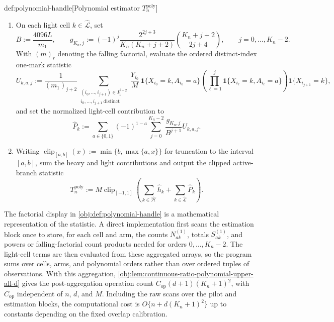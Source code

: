 \documentclass[11pt]{article}
\begin{document}
\begin{algorithmv}{def:polynomial-handle}[Polynomial estimator \(T_n^{\mathrm{poly}}\)]
\begin{enumerate}
\item On each light cell \(k\in\widehat{\mathcal L}\), set
\[
B:=\frac{4096L}{m_1},
\qquad
g_{K_n,j}:=
(-1)^j\frac{2^{2j+3}}{K_n(K_n+j+2)}{K_n+j+2\choose 2j+4},
\qquad
j=0,\ldots,K_n-2.
\]
With \((m)_r\) denoting the falling factorial, evaluate the ordered distinct-index one-mark statistic
\[
U_{k,a,j}
:=
\frac{1}{(m_1)_{j+2}}
\sum_{\substack{(i_0,\ldots,i_{j+1})\in I_1^{j+2}\\
i_0,\ldots,i_{j+1}\ \mathrm{distinct}}}
\frac{Y_{i_0}}{M}\,
\mathbf 1\{X_{i_0}=k,A_{i_0}=a\}
\left(\prod_{\ell=1}^{j}\mathbf 1\{X_{i_\ell}=k,A_{i_\ell}=a\}\right)
\mathbf 1\{X_{i_{j+1}}=k\},
\]
and set the normalized light-cell contribution to
\[
\widehat P_k
:=
\sum_{a\in\{0,1\}}(-1)^{1-a}
\sum_{j=0}^{K_n-2}\frac{g_{K_n,j}}{B^{j+1}}U_{k,a,j}.
\]

\item Writing \(\operatorname{clip}_{[a,b]}(x):=\min\{b,\max\{a,x\}\}\) for truncation to the interval \([a,b]\), sum the heavy and light contributions and output the clipped active-branch statistic
\[
T_n^{\mathrm{poly}}
:=
M\operatorname{clip}_{[-1,1]}
\left(
\sum_{k\in\widehat{\mathcal H}}\widehat h_k
+
\sum_{k\in\widehat{\mathcal L}}\widehat P_k
\right).
\]
\end{enumerate}
\end{algorithmv}

The factorial display in \cref{obj:def:polynomial-handle} is a mathematical representation of the statistic. A direct implementation first scans the estimation block once to store, for each cell and arm, the counts \(N_{ak}^{(1)}\), totals \(S_{ak}^{(1)}\), and powers or falling-factorial count products needed for orders \(0,\ldots,K_n-2\). The light-cell terms are then evaluated from these aggregated arrays, so the program sums over cells, arms, and polynomial orders rather than over ordered tuples of observations. With this aggregation, \cref{obj:lem:continuous-ratio-polynomial-upper-all-d} gives the post-aggregation operation count \(C_{\mathrm{op}}(d+1)(K_n+1)^2\), with \(C_{\mathrm{op}}\) independent of \(n\), \(d\), and \(M\). Including the raw scans over the pilot and estimation blocks, the computational cost is \(O\{n+d(K_n+1)^2\}\) up to constants depending on the fixed overlap calibration.
\end{document}
